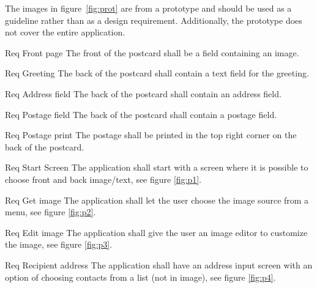 \documentclass[10pt,a4paper]{article}
\begin{document}
The images in figure~\ref{fig:prot} are from a prototype and should be used as a guideline rather than as a design requirement. Additionally, the prototype does not cover the entire application.

\begin {description}
	\item [Req \thesubsubsection {.\thedesign} Front page] The front of the postcard shall be a field containing an image.
	\item [Req \thesubsubsection {.\thedesign} Greeting] The back of the postcard shall contain a text field for the greeting.
	\item [Req \thesubsubsection {.\thedesign} Address field] The back of the postcard shall contain an address field.
	\item [Req \thesubsubsection {.\thedesign} Postage field] The back of the postcard shall contain a postage field. 
	\item [Req \thesubsubsection {.\thedesign} Postage print] The postage shall be printed in the top right corner on the back of the postcard. 
	\item [Req \thesubsubsection {.\thedesign} Start Screen] The application shall start with a screen where it is possible to choose front and back image/text, see figure \ref{fig:p1}.
	\item [Req \thesubsubsection {.\thedesign} Get image] The application shall let the user choose the image source from a menu, see figure \ref{fig:p2}.
	\item [Req \thesubsubsection {.\thedesign} Edit image] The application shall give the user an image editor to customize the image, see figure \ref{fig:p3}.
	\item [Req \thesubsubsection {.\thedesign} Recipient address] The application shall have an address input screen with an option of choosing contacts from a list (not in image), see figure \ref{fig:p4}.
\end{description}
\end{document}
